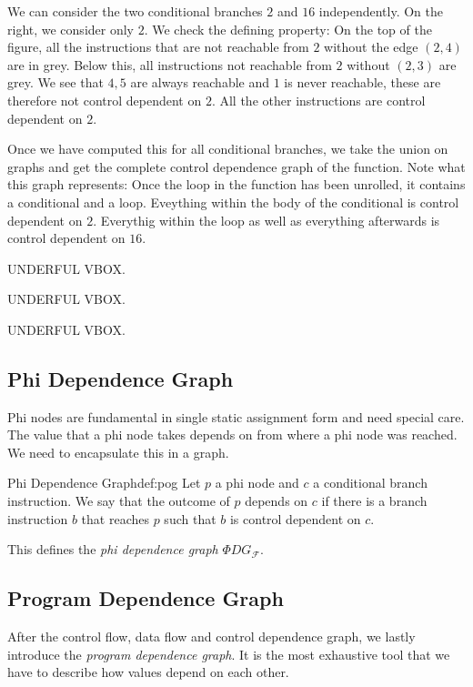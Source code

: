    We can consider the two conditional branches $2$ and $16$ independently.
    On the right, we consider only $2$.
    We check the defining property: On the top of the figure, all the
    instructions that are not reachable from $2$ without the edge $(2,4)$ are in
    grey.
    Below this, all instructions not reachable from $2$ without $(2,3)$ are
    grey.
    We see that $4,5$ are always reachable and $1$ is never reachable, these are
    therefore not control dependent on $2$.
    All the other instructions are control dependent on $2$.

    Once we have computed this for all conditional branches, we take the union
    on graphs and get the complete control dependence graph of the function.
    Note what this graph represents:
    Once the loop in the function has been unrolled, it contains a conditional
    and a loop.
    Eveything within the body of the conditional is control dependent on $2$.
    Everythig within the loop as well as everything afterwards is control
    dependent on $16$.


    UNDERFUL VBOX.

    UNDERFUL VBOX.

    UNDERFUL VBOX.


\subsection{Phi Dependence Graph}

    Phi nodes are fundamental in single static assignment form and need special
    care.
    The value that a phi node takes depends on from where a phi node was
    reached.
    We need to encapsulate this in a graph.

    \begin{definition}{Phi Dependence Graph}{def:pog}
        Let $p$ a phi node and $c$ a conditional branch instruction.
        We say that the outcome of $p$ depends on $c$ if there is a branch
        instruction $b$ that reaches $p$ such that $b$ is control dependent on
        $c$.

        This defines the {\em phi dependence graph} $\Phi DG_\mathcal{F}$.
    \end{definition}

\subsection{Program Dependence Graph}

    After the control flow, data flow and control dependence graph, we lastly
    introduce the {\em program dependence graph}.
    It is the most exhaustive tool that we have to describe how values depend on
    each other.

